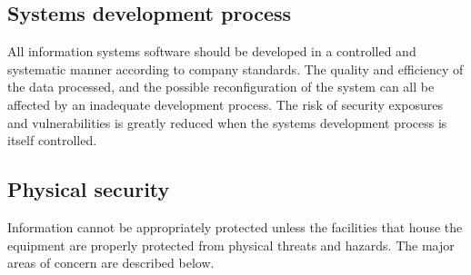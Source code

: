 \subsection{Systems development process}
All information systems software should be developed in a controlled
and systematic manner according to company standards. The quality and
efficiency of the data processed, and the possible reconfiguration of
the system can all be affected by an inadequate development process.
The risk of security exposures and vulnerabilities is greatly reduced
when the systems development process is itself controlled.


\subsection{Physical security}
Information cannot be appropriately protected unless the facilities
that house the equipment are properly protected from physical threats
and hazards. The major areas of concern are described below.


